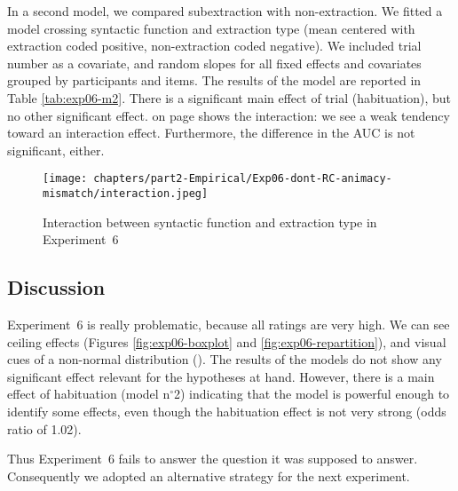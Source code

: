 

In a second model, we compared subextraction with non-extraction. We fitted a model crossing syntactic function and extraction type (mean centered with extraction coded positive, non-extraction coded negative). We included trial number as a covariate, and random slopes for all fixed effects and covariates grouped by participants and items. The results of the model are reported in Table \ref{tab:exp06-m2}. There is a significant main effect of trial (habituation), but no other significant effect.  on page \pageref{fig:exp06-interaction} shows the interaction: we see a weak tendency toward an interaction effect. Furthermore, the difference in the AUC is not significant, either.



\begin{figure}
    \centering
    \texttt{[image: chapters/part2-Empirical/Exp06-dont-RC-animacy-mismatch/interaction.jpeg]}
    \caption{Interaction between syntactic function and extraction type in Experiment~6}
    \label{fig:exp06-interaction}
\end{figure}

\subsection{Discussion}

Experiment~6 is really problematic, because all ratings are very high. We can see ceiling effects (Figures \ref{fig:exp06-boxplot} and \ref{fig:exp06-repartition}), and visual cues of a non-normal distribution (). The results of the models do not show any significant effect relevant for the hypotheses at hand. However, there is a main effect of habituation (model n$^{\circ}$2) indicating that the model is powerful enough to identify some effects, even though the habituation effect is not very strong (odds ratio of 1.02). 

Thus Experiment~6 fails to answer the question it was supposed to answer. Consequently we adopted an alternative strategy for the next experiment. 
